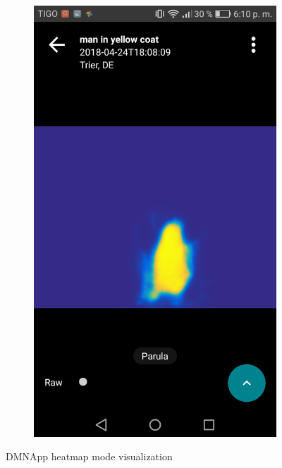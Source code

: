 \begin{figure}[!htbp]
\begin{multicols}{2}
    \begin{subfigure}[b]{\columnwidth}
            \centering
            \includegraphics[width=\textwidth]{./figures/dmn_app/views/9.png}
    \label{subfig:colormap}
    \end{subfigure}
    \end{multicols}
    
    \caption{DMNApp heatmap mode visualization}
    \label{Fig:Vis_Heat}
\end{figure}